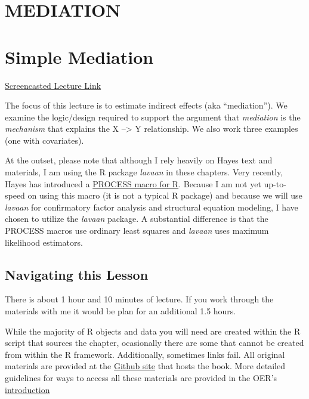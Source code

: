 \documentclass[
]{book}
\begin{document}
\hypertarget{MED}{%
\chapter*{MEDIATION}\label{MED}}

\hypertarget{SimpleMed}{%
\chapter{Simple Mediation}\label{SimpleMed}}

\href{https://spu.hosted.panopto.com/Panopto/Pages/Viewer.aspx?pid=7ffb03e6-b34b-4e0b-8f10-ad080180b069}{Screencasted Lecture Link}

The focus of this lecture is to estimate indirect effects (aka ``mediation''). We examine the logic/design required to support the argument that \emph{mediation} is the \emph{mechanism} that explains the X --\textgreater{} Y relationship. We also work three examples (one with covariates).

At the outset, please note that although I rely heavily on Hayes \citeyearpar{hayes_introduction_2018} text and materials, I am using the R package \emph{lavaan} in these chapters. Very recently, Hayes has introduced a \href{https://www.processmacro.org/index.html}{PROCESS macro for R}. Because I am not yet up-to-speed on using this macro (it is not a typical R package) and because we will use \emph{lavaan} for confirmatory factor analysis and structural equation modeling, I have chosen to utilize the \emph{lavaan} package. A substantial difference is that the PROCESS macros use ordinary least squares and \emph{lavaan} uses maximum likelihood estimators.

\hypertarget{navigating-this-lesson-4}{%
\section{Navigating this Lesson}\label{navigating-this-lesson-4}}

There is about 1 hour and 10 minutes of lecture. If you work through the materials with me it would be plan for an additional 1.5 hours.

While the majority of R objects and data you will need are created within the R script that sources the chapter, ocasionally there are some that cannot be created from within the R framework. Additionally, sometimes links fail. All original materials are provided at the \href{https://github.com/lhbikos/ReC_MultivModel}{Github site} that hosts the book. More detailed guidelines for ways to access all these materials are provided in the OER's \protect\hyperlink{ReCintro}{introduction}
\end{document}
